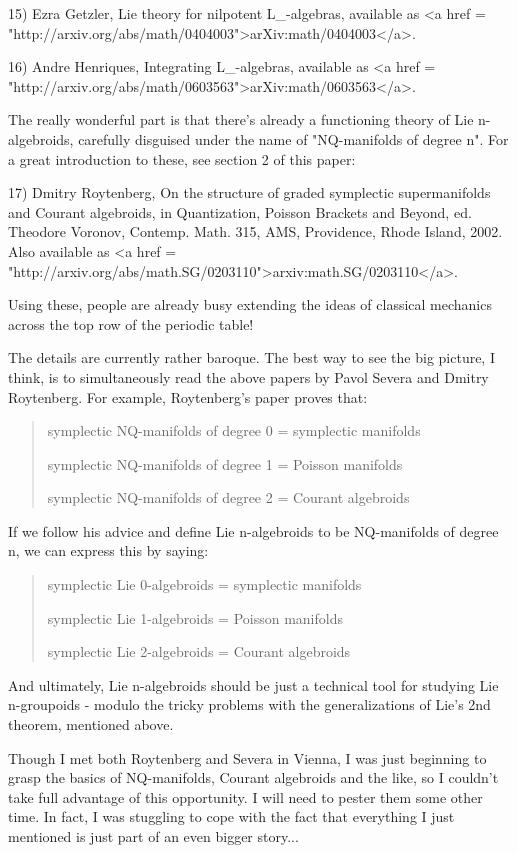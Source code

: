 15) Ezra Getzler, Lie theory for nilpotent L_{\infty }-algebras,
available as <a href = "http://arxiv.org/abs/math/0404003">arXiv:math/0404003</a>.

16) Andre Henriques, Integrating L_{\infty }-algebras, available
as <a href = "http://arxiv.org/abs/math/0603563">arXiv:math/0603563</a>.

The really wonderful part is that there's already a functioning
theory of Lie n-algebroids, carefully disguised under the name of 
"NQ-manifolds of degree n".  For a great introduction to these, 
see section 2 of this paper:

17) Dmitry Roytenberg, On the structure of graded symplectic 
supermanifolds and Courant algebroids, in Quantization, Poisson 
Brackets and Beyond, ed. Theodore Voronov, Contemp. Math. 315, 
AMS, Providence, Rhode Island, 2002.  Also available as 
<a href = "http://arxiv.org/abs/math.SG/0203110">arxiv:math.SG/0203110</a>.

Using these, people are already busy extending the ideas of
classical mechanics across the top row of the periodic table!

The details are currently rather baroque.  The best way to 
see the big picture, I think, is to simultaneously read the 
above papers by Pavol Severa and Dmitry Roytenberg.  For example,
Roytenberg's paper proves that: 

\begin{quote}
symplectic NQ-manifolds of degree 0 = symplectic manifolds

symplectic NQ-manifolds of degree 1 = Poisson manifolds
 
symplectic NQ-manifolds of degree 2 = Courant algebroids
\end{quote}

If we follow his advice and define Lie n-algebroids to be 
NQ-manifolds of degree n, we can express this by saying:

\begin{quote}
symplectic Lie 0-algebroids = symplectic manifolds

symplectic Lie 1-algebroids = Poisson manifolds
 
symplectic Lie 2-algebroids = Courant algebroids
\end{quote}

And ultimately, Lie n-algebroids should be just a technical
tool for studying Lie n-groupoids - modulo the tricky problems with
the generalizations of Lie's 2nd theorem, mentioned above.

Though I met both Roytenberg and Severa in Vienna, I was 
just beginning to grasp the basics of NQ-manifolds, Courant 
algebroids and the like, so I couldn't take full advantage of this 
opportunity.  I will need to pester them some other time.  In fact, 
I was stuggling to cope with the fact that everything I just mentioned 
is just part of an even bigger story...

